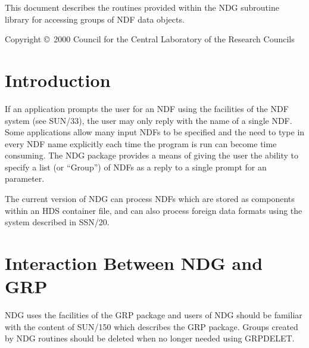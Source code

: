 \documentclass[twoside,11pt]{article}
\newcommand{\stardocinitials}  {SUN}
\newcommand{\stardoccopyright}
{Copyright \copyright\ 2000 Council for the Central Laboratory of the Research Councils}
\newcommand{\stardocnumber}    {2.8}
\newcommand{\stardocabstract}  {
This document describes the routines provided within the NDG subroutine
library for accessing groups of NDF data objects.
}
\newcommand{\stardocname}{\stardocinitials /\stardocnumber}
\newenvironment{latexonly}{}{}
\newcommand{\xref}[3]{#1}
\renewcommand{\_}{\texttt{\symbol{95}}}
\renewcommand{\thepage}{\roman{page}}
\begin{document}
\stardocabstract

\begin{latexonly}
\newpage
\vspace*{\fill}
\stardoccopyright
\end{latexonly}

  \newpage
  \begin{latexonly}
    \setlength{\parskip}{0mm}
    \tableofcontents
    \setlength{\parskip}{\medskipamount}
    \markboth{\stardocname}{\stardocname}
  \end{latexonly}

\cleardoublepage
\renewcommand{\thepage}{\arabic{page}}
\setcounter{page}{1}

\section {Introduction}

If an application prompts the user for an NDF using the facilities of the NDF\_
system (see \xref{SUN/33}{sun33}{}), the user may only reply with the name of a single NDF. Some
applications allow many input NDFs to be specified and the need to
type in every NDF name explicitly each time the program is run can become time
consuming. The NDG package provides a means of giving the user the
ability to specify a list (or ``Group'') of NDFs as a reply to a single prompt
for an parameter.

The current version of NDG can process NDFs which are stored as
components within an HDS container file, and can also process foreign
data formats using the system described in \xref{SSN/20}{ssn20}{}.


\section {Interaction Between NDG and GRP}
NDG uses the facilities of the GRP package and users of NDG should be familiar
with the content of \xref{SUN/150}{sun150}{} which describes the GRP package. Groups
created by NDG routines should be deleted when no longer needed using
\xref{GRP\_DELET}{sun150}{GRP\_DELET}.
\end{document}
